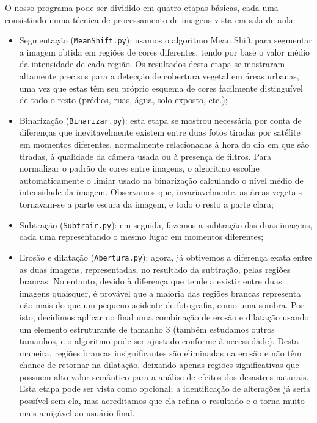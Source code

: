 \documentclass{article}
\begin{document}
O nosso programa pode ser dividido em quatro etapas básicas, cada uma consistindo numa técnica de processamento de imagens vista em sala de aula:
\begin{itemize}
  \item Segmentação (\texttt{MeanShift.py}): usamos o algoritmo Mean Shift para segmentar a imagem obtida em regiões de cores diferentes, tendo por base o valor médio da intensidade de cada região. Os resultados desta etapa se mostraram altamente precisos para a detecção de cobertura vegetal em áreas urbanas, uma vez que estas têm seu próprio esquema de cores facilmente distinguível de todo o resto (prédios, ruas, água, solo exposto, etc.);
  \item Binarização (\texttt{Binarizar.py}): esta etapa se mostrou necessária por conta de diferenças que inevitavelmente existem entre duas fotos tiradas por satélite em momentos diferentes, normalmente relacionadas à hora do dia em que são tiradas, à qualidade da câmera usada ou à presença de filtros. Para normalizar o padrão de cores entre imagens, o algoritmo escolhe automaticamente o limiar usado na binarização calculando o nível médio de intensidade da imagem. Observamos que, invariavelmente, as áreas vegetais tornavam-se a parte escura da imagem, e todo o resto a parte clara;
  \item Subtração (\texttt{Subtrair.py}): em seguida, fazemos a subtração das duas imagens, cada uma representando o mesmo lugar em momentos diferentes;
  \item Erosão e dilatação (\texttt{Abertura.py}): agora, já obtivemos a diferença exata entre as duas imagens, representadas, no resultado da subtração, pelas regiões brancas. No entanto, devido à diferença que tende a existir entre duas imagens quaisquer, é provável que a maioria das regiões brancas representa não mais do que um pequeno acidente de fotografia, como uma sombra. Por isto, decidimos aplicar no final uma combinação de erosão e dilatação usando um elemento estruturante de tamanho 3 (também estudamos outros tamanhos, e o algoritmo pode ser ajustado conforme à necessidade). Desta maneira, regiões brancas insignificantes são eliminadas na erosão e não têm chance de retornar na dilatação, deixando apenas regiões significativas que possuem alto valor semântico para a análise de efeitos dos desastres naturais. Esta etapa pode ser vista como opcional; a identificação de alterações já seria possível sem ela, mas acreditamos que ela refina o resultado e o torna muito mais amigável ao usuário final.
\end{itemize}
\end{document}
